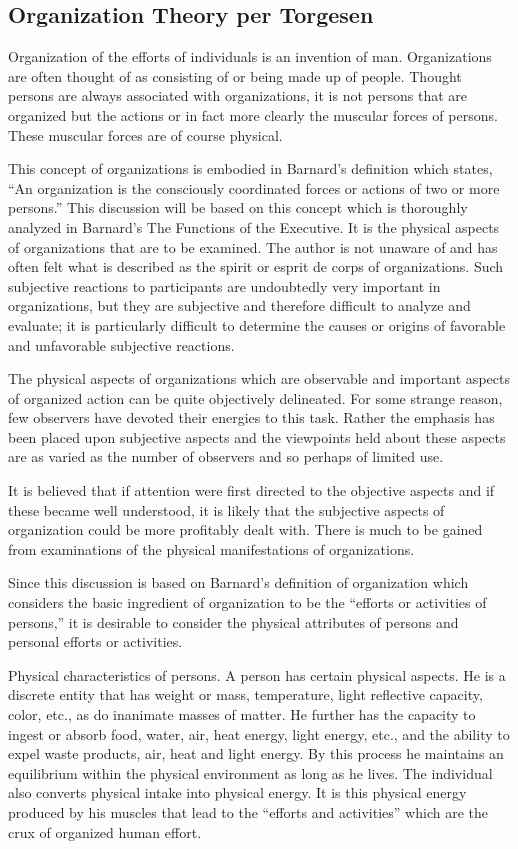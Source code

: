 \subsection{Organization Theory per Torgesen}

Organization of the efforts of individuals is an invention of man. Organizations are often thought of as consisting of or being made up of people. Thought persons are always associated with organizations, it is not persons that are organized but the actions or in fact more clearly the muscular forces of persons. These muscular forces are of course physical.

This concept of organizations is embodied in Barnard’s definition which states, “An organization is the consciously coordinated forces or actions of two or more persons.”  This discussion will be based on this concept which is thoroughly analyzed in Barnard’s The Functions of the Executive. It is the physical aspects of organizations that are to be examined. The author is not unaware of and has often felt what is described as the spirit or esprit de corps of organizations. Such subjective reactions to participants are undoubtedly very important in organizations, but they are subjective and therefore difficult to analyze and evaluate; it is particularly difficult to determine the causes or origins of favorable and unfavorable subjective reactions.

The physical aspects of organizations which are observable and important aspects of organized action can be quite objectively delineated. For some strange reason, few observers have devoted their energies to this task. Rather the emphasis has been placed upon subjective aspects and the viewpoints held about these aspects are as varied as the number of observers and so perhaps of limited use.

It is believed that if attention were first directed to the objective aspects and if these became well understood, it is likely that the subjective aspects of organization could be more profitably dealt with.
There is much to be gained from examinations of the physical manifestations of organizations.

Since this discussion is based on Barnard’s definition of organization which considers the basic ingredient of organization to be the ``efforts or activities of persons,'' it is desirable to consider the physical attributes of persons and personal efforts or activities.

Physical characteristics of persons. A person has certain physical aspects. He is a discrete entity that has weight or mass, temperature, light reflective capacity, color, etc., as do inanimate masses of matter. He further has the capacity to ingest or absorb food, water, air, heat energy, light energy, etc., and the ability to expel waste products, air, heat and light energy. By this process he maintains an equilibrium within the physical environment as long as he lives. The individual also converts physical intake into physical energy. It is this physical energy produced by his muscles that lead to the ``efforts and activities'' which are the crux of organized human effort.

